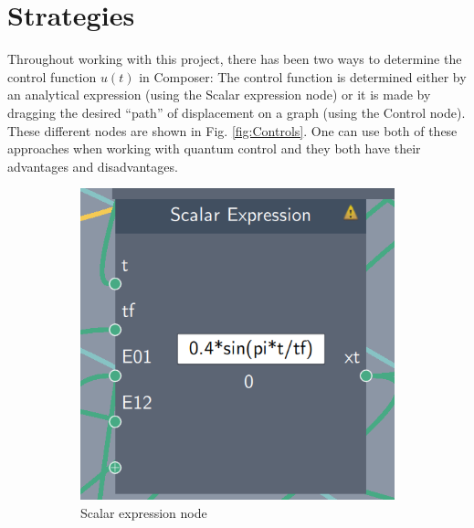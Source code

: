 \documentclass[a4paper, twocolumn]{revtex4-1}
\begin{document}
\section{Strategies}\label{sec:strats}
Throughout working with this project, there has been two ways to determine the control function $u(t)$ in Composer: The control function is determined either by an analytical expression (using the Scalar expression node) or it is made by dragging the desired ``path'' of displacement on a graph (using the Control node). These different nodes are shown in Fig. \ref{fig:Controls}. One can use both of these approaches when working with quantum control and they both have their advantages and disadvantages. \\

\begin{figure}[h]
	\begin{subfigure}[b]{0.4\columnwidth}
		\centering
		\includegraphics[width=\columnwidth]{graphics/composerScreens/ScalarExpressionNode.png}
		\caption{Scalar expression node}
	\end{subfigure}
	\hfill
	\begin{subfigure}[b]{0.45\columnwidth}
		\centering

\end{subfigure}
\end{figure}
\end{document}
